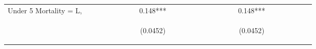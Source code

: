 \documentclass[]{article}
\begin{document}
\begin{center}
\begin{tabular}{lcccccccccccccccccccccccc}
Under 5 Mortality = L, &  &  &  &  &  &  &  & 0.148*** &  &  &  &  &  &  &  &  &  & 0.148*** &  &  &  &  &  &  \\
 & \begin{footnotesize}\end{footnotesize} & \begin{footnotesize}\end{footnotesize} & \begin{footnotesize}\end{footnotesize} & \begin{footnotesize}\end{footnotesize} & \begin{footnotesize}\end{footnotesize} & \begin{footnotesize}\end{footnotesize} & \begin{footnotesize}\end{footnotesize} & \begin{footnotesize}(0.0452)\end{footnotesize} & \begin{footnotesize}\end{footnotesize} & \begin{footnotesize}\end{footnotesize} & \begin{footnotesize}\end{footnotesize} & \begin{footnotesize}\end{footnotesize} & \begin{footnotesize}\end{footnotesize} & \begin{footnotesize}\end{footnotesize} & \begin{footnotesize}\end{footnotesize} & \begin{footnotesize}\end{footnotesize} & \begin{footnotesize}\end{footnotesize} & \begin{footnotesize}(0.0452)\end{footnotesize} & \begin{footnotesize}\end{footnotesize} & \begin{footnotesize}\end{footnotesize} & \begin{footnotesize}\end{footnotesize} & \begin{footnotesize}\end{footnotesize} & \begin{footnotesize}\end{footnotesize} & \begin{footnotesize}\end{footnotesize} \\

\end{tabular}
\end{center}
\end{document}
